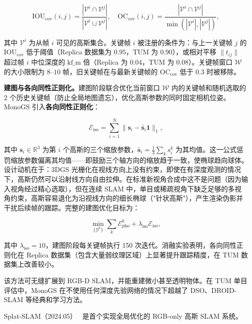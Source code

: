 \begin{equation*}
\mathrm{IOU}_{\mathrm{cov}}(i, j) = \frac{|\mathcal{V}^i \cap \mathcal{V}^j|}{|\mathcal{V}^i \cup \mathcal{V}^j|}, \quad
\mathrm{OC}_{\mathrm{cov}}(i, j) = \frac{|\mathcal{V}^i \cap \mathcal{V}^j|}{\min(|\mathcal{V}^i|, |\mathcal{V}^j|)},
\end{equation*}

其中 $\mathcal{V}^i$ 为从帧 $i$ 可见的高斯集合。关键帧 $i$ 被注册的条件为：与上一关键帧 $j$ 的 $\mathrm{IOU}_{\mathrm{cov}}$ 低于阈值（Replica 数据集为 $0.95$，TUM 为 $0.90$），或相对平移 $\|t_{ij}\|$ 超过帧 $i$ 中位深度的 $\text{kf\_m}$ 倍（Replica 为 $0.04$，TUM 为 $0.08$）。关键帧窗口 $\mathcal{W}$ 的大小限制为 $8$--$10$ 帧，旧关键帧在与最新关键帧的 $\mathrm{OC}_{\mathrm{cov}}$ 低于 $0.3$ 时被移除。

\textbf{建图与各向同性正则化。}建图阶段联合优化当前窗口 $\mathcal{W}$ 内的关键帧和随机选取的 2 个历史关键帧（防止全局地图遗忘），优化高斯参数的同时固定相机位姿。MonoGS 引入\textbf{各向同性正则化}：

\begin{equation*}
\mathcal{E}_{\mathrm{iso}} = \sum_{i=1}^{N} \| \mathbf{s}_i - \bar{\mathbf{s}}_i \mathbf{1} \|_1,
\end{equation*}

其中 $\mathbf{s}_i \in \mathbb{R}^3$ 为第 $i$ 个高斯的三个缩放参数，$\bar{\mathbf{s}}_i = \frac{1}{3}\sum_k s_i^k$ 为其均值。这一公式惩罚缩放参数偏离其均值——即鼓励三个轴方向的缩放趋于一致，使椭球趋向球体。设计动机在于：3DGS 光栅化在视线方向上没有约束，即使在有深度观测的情况下，高斯仍然可以沿射线方向自由拉伸。在标准新视角合成中这不是问题（因为输入视角经过精心选取），但在连续 SLAM 中，单目或稀疏视角下缺乏足够的多视角约束，高斯容易退化为沿视线方向的细长椭球（"针状高斯"），产生渲染伪影并干扰后续帧的跟踪。完整的建图优化目标为：

\begin{equation*}
\min_{\{\mathcal{G}^k\}} \sum_k \mathcal{E}^k_{\mathrm{pho}} + \lambda_{\mathrm{iso}} \mathcal{E}_{\mathrm{iso}},
\end{equation*}

其中 $\lambda_{\mathrm{iso}} = 10$，建图阶段每关键帧执行 150 次迭代。消融实验表明，各向同性正则化在 Replica 数据集（包含大量弱纹理区域）上显著提升跟踪精度，在 TUM 数据集上改善较小。

该方法可无缝扩展到 RGB-D SLAM，并能重建微小甚至透明物体。在 TUM 单目评估中，MonoGS 在不使用任何深度先验网络的情况下超越了 DSO、DROID-SLAM 等经典和学习方法。

Splat-SLAM（2024.05）~\cite{2405_16544} 是首个实现全局优化的 RGB-only 高斯 SLAM 系统。


